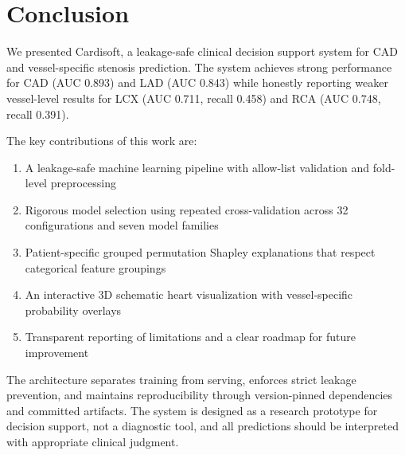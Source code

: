 \documentclass[conference]{IEEEtran}
\begin{document}
\section{Conclusion}

We presented Cardisoft, a leakage-safe clinical decision support system for CAD and vessel-specific stenosis prediction. The system achieves strong performance for CAD (AUC 0.893) and LAD (AUC 0.843) while honestly reporting weaker vessel-level results for LCX (AUC 0.711, recall 0.458) and RCA (AUC 0.748, recall 0.391).

The key contributions of this work are:
\begin{enumerate}
    \item A leakage-safe machine learning pipeline with allow-list validation and fold-level preprocessing
    \item Rigorous model selection using repeated cross-validation across 32 configurations and seven model families
    \item Patient-specific grouped permutation Shapley explanations that respect categorical feature groupings
    \item An interactive 3D schematic heart visualization with vessel-specific probability overlays
    \item Transparent reporting of limitations and a clear roadmap for future improvement
\end{enumerate}

The architecture separates training from serving, enforces strict leakage prevention, and maintains reproducibility through version-pinned dependencies and committed artifacts. The system is designed as a research prototype for decision support, not a diagnostic tool, and all predictions should be interpreted with appropriate clinical judgment.
\end{document}
